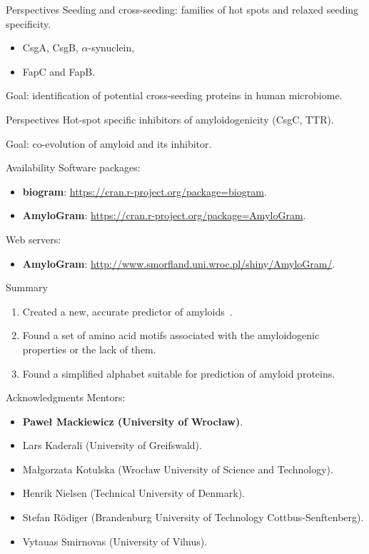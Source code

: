 \documentclass{beamer}\usepackage[]{graphicx}\usepackage[]{color}
\begin{document}
\begin{frame}{Perspectives}
Seeding and cross-seeding: families of hot spots and relaxed seeding specificity.
\begin{itemize}
\item CsgA, CsgB, $\alpha$-synuclein,
\item FapC and FapB.
\end{itemize}

Goal: identification of potential cross-seeding proteins in human microbiome.
\end{frame}  

\begin{frame}{Perspectives}
Hot-spot specific inhibitors of amyloidogenicity (CsgC, TTR).

Goal: co-evolution of amyloid and its inhibitor.
\end{frame}  

\begin{frame}{Availability}
Software packages:
\begin{itemize}
\item \textbf{biogram}: \url{https://cran.r-project.org/package=biogram}.
\item \textbf{AmyloGram}: \url{https://cran.r-project.org/package=AmyloGram}.
\end{itemize}

Web servers:
\begin{itemize}
\item \textbf{AmyloGram}: \url{http://www.smorfland.uni.wroc.pl/shiny/AmyloGram/}.
\end{itemize}
\end{frame}  

\begin{frame}{Summary}
\begin{enumerate}
\item Created a new, accurate predictor of amyloids~\citep{BurdukiewiczAmyloidogenicmotifsrevealed2017}.
\item Found a set of amino acid motifs associated with the amyloidogenic properties or the lack of them.
\item Found a simplified alphabet suitable for prediction of amyloid proteins.
\end{enumerate}
\end{frame}  

\begin{frame}{Acknowledgments}
Mentors:
\begin{itemize}
\item \textbf{Paweł Mackiewicz (University of Wrocław)}.
\item Lars Kaderali (University of Greifswald).
\item Małgorzata Kotulska (Wrocław University of Science and Technology).
\item Henrik Nielsen (Technical University of Denmark).
\item Stefan Rödiger (Brandenburg University of Technology Cottbus-Senftenberg).
\item Vytauas Smirnovas (University of Vilnus). 
\end{itemize}
\end{frame}
\end{document}
